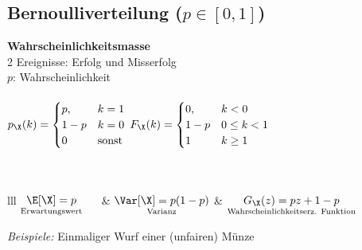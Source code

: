 \documentclass[german,color,6pt]{latex4ei/latex4ei_sheet}
\begin{document}
\begin{sectionbox}
	\subsection{Bernoulliverteilung ($p \in [0,1]$)}
	\textbf{Wahrscheinlichkeitsmasse} \\
	2 Ereignisse: Erfolg und Misserfolg\\
	$p$: Wahrscheinlichkeit  \\ \\
	$p_{\X}(k) = \begin{cases}
	p, & k = 1 \\
	1-p & k = 0 \\
	0 & \text{sonst}\\
	\end{cases}$ \qquad\quad
	$F_{\X}(k) = \begin{cases}
	0, & k < 0 \\
	1-p & 0 \le k < 1 \\
	1 & k \ge 1\\
	\end{cases}$
	\\ \\  \\
	\everymath{\displaystyle}
	\begin{tablebox}{lll}
		$\underset{\text{Erwartungswert}}{\E[\X] = p}\quad\ $ & $\underset{\text{Varianz}}{\Var[\X] = p (1-p)}$ & $\underset{\text{Wahrscheinlichkeitserz. Funktion}}{G_{\X} (z) = pz + 1 -p}$
	\end{tablebox}
	\emph{Beispiele:} Einmaliger Wurf einer (unfairen) Münze
\end{sectionbox}
\end{document}
